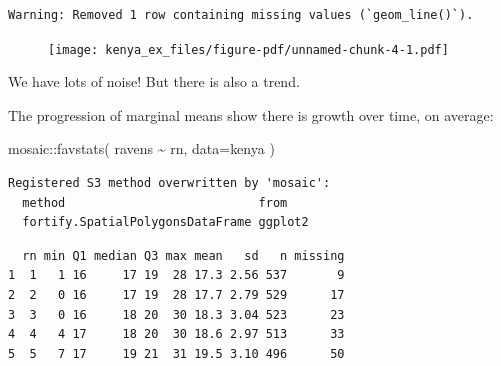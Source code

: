 \documentclass[
  letterpaper,
  DIV=11,
  numbers=noendperiod]{scrreprt}
\newenvironment{Shaded}{\begin{snugshade}}{\end{snugshade}}
\newcommand{\AttributeTok}[1]{\textcolor[rgb]{0.49,0.56,0.16}{#1}}
\newcommand{\DecValTok}[1]{\textcolor[rgb]{0.25,0.63,0.44}{#1}}
\newcommand{\FloatTok}[1]{\textcolor[rgb]{0.25,0.63,0.44}{#1}}
\newcommand{\FunctionTok}[1]{\textcolor[rgb]{0.02,0.16,0.49}{#1}}
\newcommand{\NormalTok}[1]{\textcolor[rgb]{0.00,0.44,0.13}{#1}}
\newcommand{\OtherTok}[1]{\textcolor[rgb]{0.00,0.44,0.13}{#1}}
\newcommand{\SpecialCharTok}[1]{\textcolor[rgb]{0.25,0.44,0.63}{#1}}
\begin{document}
\begin{Shaded}
\end{Shaded}

\begin{verbatim}
Warning: Removed 1 row containing missing values (`geom_line()`).
\end{verbatim}

\begin{figure}[H]

{\centering \texttt{[image: kenya\_ex\_files/figure-pdf/unnamed-chunk-4-1.pdf]}

}

\end{figure}

We have lots of noise! But there is also a trend.

The progression of marginal means show there is growth over time, on
average:

\begin{Shaded}
\begin{Highlighting}[]
\NormalTok{mosaic}\SpecialCharTok{::}\FunctionTok{favstats}\NormalTok{( ravens }\SpecialCharTok{\textasciitilde{}}\NormalTok{ rn, }\AttributeTok{data=}\NormalTok{kenya )}
\end{Highlighting}
\end{Shaded}

\begin{verbatim}
Registered S3 method overwritten by 'mosaic':
  method                           from   
  fortify.SpatialPolygonsDataFrame ggplot2
\end{verbatim}

\begin{verbatim}
  rn min Q1 median Q3 max mean   sd   n missing
1  1   1 16     17 19  28 17.3 2.56 537       9
2  2   0 16     17 19  28 17.7 2.79 529      17
3  3   0 16     18 20  30 18.3 3.04 523      23
4  4   4 17     18 20  30 18.6 2.97 513      33
5  5   7 17     19 21  31 19.5 3.10 496      50
\end{verbatim}
\end{document}
